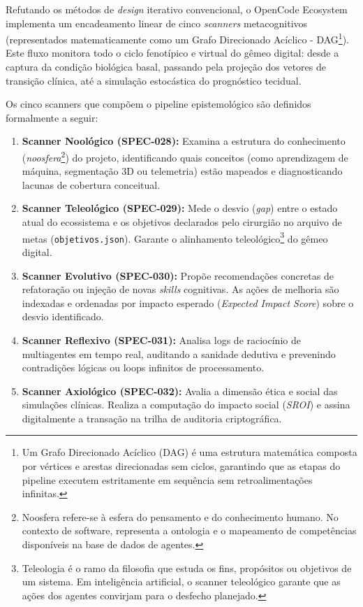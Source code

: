 Refutando os métodos de \textit{design} iterativo convencional, o OpenCode Ecosystem implementa um encadeamento linear de cinco \textit{scanners} metacognitivos (representados matematicamente como um Grafo Direcionado Acíclico - DAG\footnote{Um Grafo Direcionado Acíclico (DAG) é uma estrutura matemática composta por vértices e arestas direcionadas sem ciclos, garantindo que as etapas do pipeline executem estritamente em sequência sem retroalimentações infinitas.}). Este fluxo monitora todo o ciclo fenotípico e virtual do gêmeo digital: desde a captura da condição biológica basal, passando pela projeção dos vetores de transição clínica, até a simulação estocástica do prognóstico tecidual. 

Os cinco scanners que compõem o pipeline epistemológico são definidos formalmente a seguir:

\begin{enumerate}
    \item \textbf{Scanner Noológico (SPEC-028):} Examina a estrutura do conhecimento (\textit{noosfera}\footnote{Noosfera refere-se à esfera do pensamento e do conhecimento humano. No contexto de software, representa a ontologia e o mapeamento de competências disponíveis na base de dados de agentes.}) do projeto, identificando quais conceitos (como aprendizagem de máquina, segmentação 3D ou telemetria) estão mapeados e diagnosticando lacunas de cobertura conceitual.
    \item \textbf{Scanner Teleológico (SPEC-029):} Mede o desvio (\textit{gap}) entre o estado atual do ecossistema e os objetivos declarados pelo cirurgião no arquivo de metas (\texttt{objetivos.json}). Garante o alinhamento teleológico\footnote{Teleologia é o ramo da filosofia que estuda os fins, propósitos ou objetivos de um sistema. Em inteligência artificial, o scanner teleológico garante que as ações dos agentes convirjam para o desfecho planejado.} do gêmeo digital.
    \item \textbf{Scanner Evolutivo (SPEC-030):} Propõe recomendações concretas de refatoração ou injeção de novas \textit{skills} cognitivas. As ações de melhoria são indexadas e ordenadas por impacto esperado (\textit{Expected Impact Score}) sobre o desvio identificado.
    \item \textbf{Scanner Reflexivo (SPEC-031):} Analisa logs de raciocínio de multiagentes em tempo real, auditando a sanidade dedutiva e prevenindo contradições lógicas ou loops infinitos de processamento.
    \item \textbf{Scanner Axiológico (SPEC-032):} Avalia a dimensão ética e social das simulações clínicas. Realiza a computação do impacto social (\textit{SROI}) e assina digitalmente a transação na trilha de auditoria criptográfica.
\end{enumerate}

